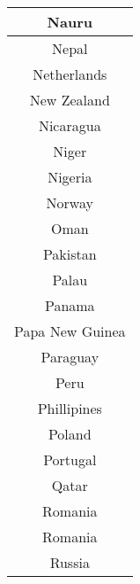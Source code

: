 \documentclass{article}
\begin{document}
\begin{center}
\begin{tabular} {|| c ||}
   Nauru\\ \hline 
   Nepal\\ \hline 
   Netherlands\\ \hline 
   New Zealand\\ \hline 
   Nicaragua\\ \hline 
   Niger\\ \hline 
   Nigeria\\ \hline 
   Norway\\ \hline 
   Oman\\ \hline 
   Pakistan\\ \hline 
   Palau\\ \hline 
   Panama\\ \hline 
   Papa New Guinea\\ \hline 
   Paraguay\\ \hline 
   Peru\\ \hline 
   Phillipines\\ \hline 
   Poland\\ \hline 
   Portugal\\ \hline 
   Qatar\\ \hline 
   Romania\\ \hline 
   Romania\\ \hline 
   Russia\\ \hline 
\end{tabular}
\end{center}
\end{document}

